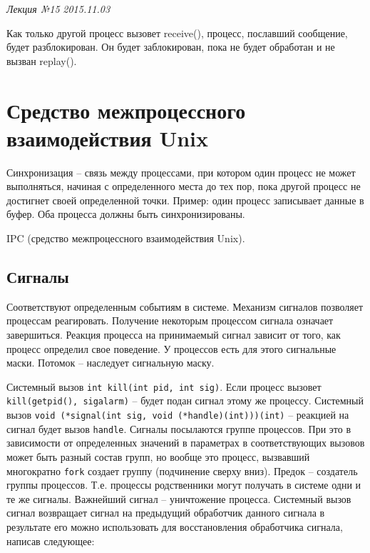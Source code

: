 \clearpage
\begin{flushright}
    \textit{Лекция №15}
    \textit{2015.11.03}
\end{flushright}

Как только другой процесс вызовет receive(), процесс, пославший сообщение, будет разблокирован. Он будет заблокирован, пока не будет обработан и не вызван replay().

\chapter{Средство межпроцессного взаимодействия Unix}
Синхронизация – связь между процессами, при котором один процесс не может выполняться, начиная с определенного места до тех пор, пока другой процесс не достигнет своей определенной точки. Пример: один процесс записывает данные в буфер. Оба процесса должны быть синхронизированы.

IPC (средство межпроцессного взаимодействия Unix). 

\section{Сигналы}

Соответствуют определенным событиям в системе. Механизм сигналов позволяет процессам реагировать. Получение некоторым процессом сигнала означает завершиться. Реакция процесса на принимаемый сигнал зависит от того, как процесс определил свое поведение. У процессов есть для этого сигнальные маски. Потомок – наследует сигнальную маску.

Системный вызов \verb|int kill(int pid, int sig)|. Если процесс вызовет \verb|kill(getpid(), sigalarm)| – будет подан сигнал этому же процессу. 
Системный вызов \verb|void (*signal(int sig, void (*handle)(int)))(int)| – реакцией на сигнал будет вызов \verb|handle|. Сигналы посылаются группе процессов. При это в зависимости от определенных значений в параметрах в соответствующих вызовов может быть разный состав групп, но вообще это процесс, вызвавший многократно \verb|fork| создает группу (подчинение сверху вниз). Предок – создатель группы процессов. Т.е. процессы родственники могут получать в системе одни и те же сигналы. Важнейший сигнал – уничтожение процесса. Системный вызов сигнал возвращает сигнал на предыдущий обработчик данного сигнала в результате его можно использовать для восстановления обработчика сигнала, написав следующее:

